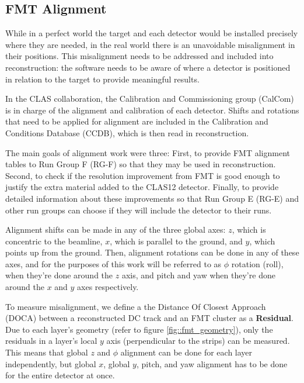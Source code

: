 \subsection{FMT Alignment} \label{ssec::fmtalignment}
    While in a perfect world the target and each detector would be installed precisely where they are needed, in the real world there is an unavoidable misalignment in their positions.
    This misalignment needs to be addressed and included into reconstruction:
    the software needs to be aware of where a detector is positioned in relation to the target to provide meaningful results.
    
    In the CLAS collaboration, the Calibration and Commissioning group (CalCom) is in charge of the alignment and calibration of each detector.
    Shifts and rotations that need to be applied for alignment are included in the Calibration and Conditions Database (CCDB), which is then read in reconstruction. %
    
    The main goals of alignment work were three:
    First, to provide FMT alignment tables to Run Group F (RG-F) so that they may be used in reconstruction.
    Second, to check if the resolution improvement from FMT is good enough to justify the extra material added to the CLAS12 detector.
    Finally, to provide detailed information about these improvements so that Run Group E (RG-E) and other run groups can choose if they will include the detector to their runs.

    Alignment shifts can be made in any of the three global axes:
    $z$, which is concentric to the beamline, $x$, which is parallel to the ground, and $y$, which points up from the ground.
    Then, alignment rotations can be done in any of these axes, and for the purposes of this work will be referred to as $\phi$ rotation (roll), when they're done around the $z$ axis, and pitch and yaw when they're done around the $x$ and $y$ axes respectively.
    
    To measure misalignment, we define a the Distance Of Closest Approach (DOCA) between a reconstructed DC track and an FMT cluster as a \textbf{Residual}.
    Due to each layer's geometry (refer to figure \ref{fig::fmt_geometry}), only the residuals in a layer's local $y$ axis (perpendicular to the strips) can be measured.
    This means that global $z$ and $\phi$ alignment can be done for each layer independently, but global $x$, global $y$, pitch, and yaw alignment has to be done for the entire detector at once.

